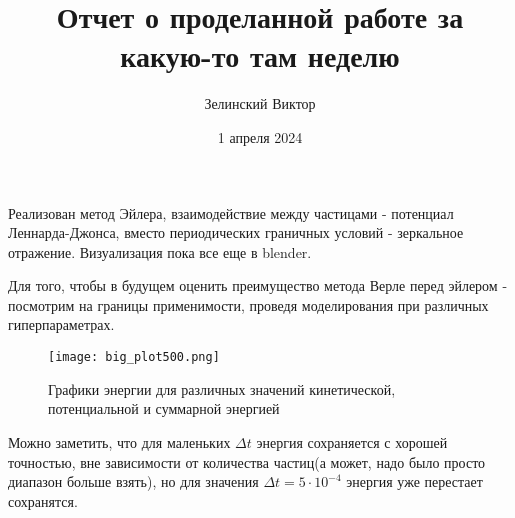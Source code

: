 \documentclass[a4paper, 12pt]{report}
\title{Отчет о проделанной работе за какую-то там неделю}
\author{Зелинский Виктор}
\date{1 апреля 2024}
\begin{document}
	\maketitle
	\newpage
	Реализован метод Эйлера, взаимодействие между частицами - потенциал Леннарда-Джонса, вместо периодических граничных условий - зеркальное отражение. Визуализация пока все еще в blender.
	
	Для того, чтобы в будущем оценить преимущество метода Верле перед эйлером - посмотрим на границы применимости, проведя моделирования при различных гиперпараметрах.
	
	\begin{figure}[h]
		\texttt{[image: big\_plot500.png]}
		\caption{Графики энергии для различных значений кинетической, потенциальной и суммарной энергией}
		\label{fig:bigplot}
	\end{figure}

	Можно заметить, что для маленьких $\Delta t$  энергия сохраняется с хорошей точностью, вне зависимости от количества частиц(а может, надо было просто диапазон больше взять), но для значения $\Delta t = 5\cdot 10^{-4}$ энергия уже перестает сохранятся.
\end{document}

